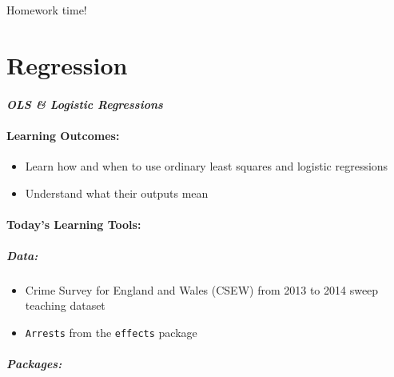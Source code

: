 \documentclass[
]{book}
\providecommand{\tightlist}{%
  \setlength{\itemsep}{0pt}\setlength{\parskip}{0pt}}
\begin{document}
Homework time!

\hypertarget{regression}{%
\chapter{Regression}\label{regression}}

\hypertarget{ols-logistic-regressions}{%
\subsubsection*{\texorpdfstring{\emph{OLS \& Logistic Regressions}}{OLS \& Logistic Regressions}}\label{ols-logistic-regressions}}

\hypertarget{learning-outcomes-8}{%
\subsubsection*{Learning Outcomes:}\label{learning-outcomes-8}}

\begin{itemize}
\tightlist
\item
  Learn how and when to use ordinary least squares and logistic regressions
\item
  Understand what their outputs mean
\end{itemize}

\hypertarget{todays-learning-tools-8}{%
\subsubsection*{Today's Learning Tools:}\label{todays-learning-tools-8}}

\hypertarget{data-8}{%
\paragraph*{\texorpdfstring{\emph{Data:}}{Data:}}\label{data-8}}

\begin{itemize}
\tightlist
\item
  Crime Survey for England and Wales (CSEW) from 2013 to 2014 sweep teaching dataset
\item
  \texttt{Arrests} from the \texttt{effects} package
\end{itemize}

\hypertarget{packages-9}{%
\paragraph*{\texorpdfstring{\emph{Packages:}}{Packages:}}\label{packages-9}}
\end{document}
